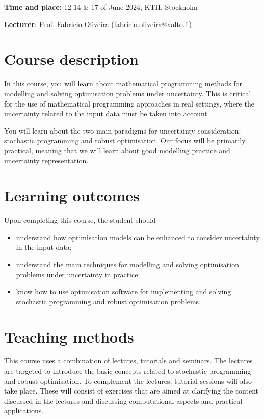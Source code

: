 \documentclass[a4paper]{artikel3}
\begin{document}

{\bf Time and place:} 12-14 \& 17 of June 2024, KTH, Stockholm
 
{\bf Lecturer}: Prof. Fabricio Oliveira (fabricio.oliveira@aalto.fi)

\section{Course description}

In this course, you will learn about mathematical programming methods for modelling and solving optimisation problems under uncertainty. This is critical for the use of mathematical programming approaches in real settings, where the uncertainty related to the input data must be taken into account. 

You will learn about the two main paradigms for uncertainty consideration: stochastic programming and robust optimisation. Our focus will be primarily practical, meaning that we will learn about good modelling practice and uncertainty representation. 


\section{Learning outcomes}

Upon completing this course, the student should 
\begin{itemize}
    \item understand how optimisation models can be enhanced to consider uncertainty in the input data;
    \item understand the main techniques for modelling and solving optimisation problems under uncertainty in practice;
    \item know how to use optimisation software for implementing and solving stochastic programming and robust optimisation problems.
\end{itemize}


\section{Teaching methods}

This course uses a combination of lectures, tutorials and seminars. The lectures are targeted to introduce the basic concepts related to stochastic programming and robust optimisation. To complement the lectures, tutorial sessions will also take place. These will consist of exercises that are aimed at clarifying the content discussed in the lectures and discussing computational aspects and practical applications. 
\end{document}
